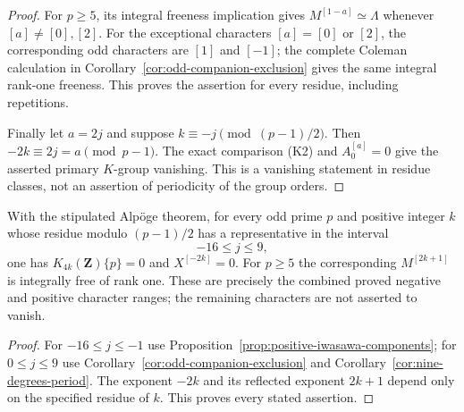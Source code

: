 \begin{proof}
For $p\geq5$, its integral freeness implication gives
$M^{[1-a]}\simeq\Lambda$ whenever $[a]\ne[0],[2]$.
For the exceptional characters $[a]=[0]$ or $[2]$, the
corresponding odd characters are $[1]$ and $[-1]$; the complete
Coleman calculation in Corollary~\ref{cor:odd-companion-exclusion}
gives the same integral rank-one freeness. This proves the
assertion for every residue, including repetitions.

Finally let $a=2j$ and suppose
$k\equiv-j\pmod{(p-1)/2}$. Then
$-2k\equiv2j=a\pmod{p-1}$. The exact comparison (K2)
and $A_0^{[a]}=0$ give the asserted primary $K$-group
vanishing. This is a vanishing statement in residue classes,
not an assertion of periodicity of the group orders.
\end{proof}

\begin{corollary}
\label{cor:two-sided-component-range}
With the stipulated Alp\"oge theorem, for every odd prime $p$
and positive integer $k$ whose residue modulo $(p-1)/2$
has a representative in the interval
\[
                              -16\leq j\leq9,
 \tag{PC.4}
\]
one has $K_{4k}(\mathbf Z)\{p\}=0$ and
$X^{[-2k]}=0$. For $p\geq5$ the corresponding
$M^{[2k+1]}$ is integrally free of rank one. These are precisely
the combined proved negative and positive character ranges;
the remaining characters are not asserted to vanish.
\end{corollary}

\begin{proof}
For $-16\leq j\leq-1$ use
Proposition~\ref{prop:positive-iwasawa-components}; for
$0\leq j\leq9$ use Corollary~\ref{cor:odd-companion-exclusion}
and Corollary~\ref{cor:nine-degrees-period}. The exponent
$-2k$ and its reflected exponent $2k+1$ depend only on the
specified residue of $k$. This proves every stated assertion.
\end{proof}

